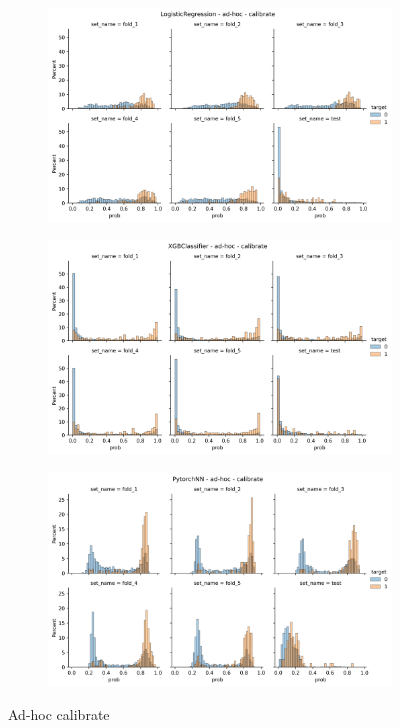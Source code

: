 \begin{figure}
    \centering
    \begin{subfigure}[b]{0.83\textwidth}
    \includegraphics[width=\linewidth]{figures/results/ad-hoc/lgr/calibrate/calibrate__distplot.png}
    \end{subfigure}
    \hfill
    \centering
    \begin{subfigure}[b]{0.83\textwidth}
        \centering
        \includegraphics[width=\linewidth]{figures/results/ad-hoc/xgb/2021-12-07_06.29.19.600877__distplot (2).png}
    \end{subfigure}
    \hfill
    \centering
    \begin{subfigure}[b]{0.83\textwidth}
        \centering
        \includegraphics[width=\linewidth]{figures/results/ad-hoc/nn/2021-12-06_17.03.17.314982__distplot.png}
    \end{subfigure}
    \caption{Ad-hoc calibrate}
\end{figure}

